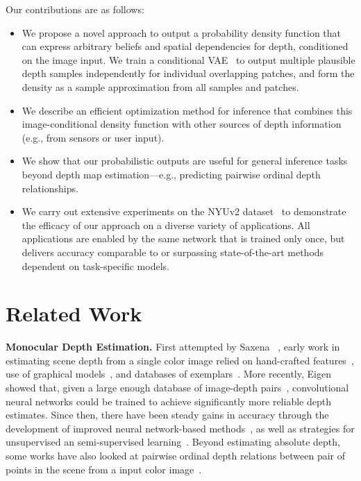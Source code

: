 \documentclass[10pt,twocolumn,letterpaper]{article}
\begin{document}
Our contributions are as follows:
\begin{itemize}[nosep,leftmargin=]
\item We propose a novel approach to output a probability density function that can express arbitrary beliefs and spatial dependencies for depth, conditioned on the image input. We train a conditional VAE~\cite{condVAE} to output multiple plausible depth samples independently for individual overlapping patches, and form the density as a sample approximation from all samples and patches.
\item We describe an efficient optimization method for inference that combines this image-conditional density function with other sources of depth information (e.g., from sensors or user input).
\item We show that our probabilistic outputs are useful for general inference tasks beyond depth map estimation---e.g., predicting pairwise ordinal depth relationships.
\item We carry out extensive experiments on the NYUv2 dataset~\cite{silberman2012indoor} to demonstrate the efficacy of our approach on a diverse variety of applications. All applications are enabled by the same network that is trained only once, but delivers accuracy comparable to or surpassing state-of-the-art methods dependent on task-specific models.
\end{itemize}

\section{Related Work}
\label{sec:rw}

\noindent\textbf{Monocular Depth Estimation.} First attempted by Saxena \etal~\cite{saxena2006learning}, early work in estimating scene depth from a single color image relied on hand-crafted features~\cite{saxena2009make3d,ladicky2014pulling,shi2015break,ranftl2016dense}, use of graphical models~\cite{saxena2009make3d,liu2014discrete,zhuo2015indoor}, and databases of exemplars~\cite{konrad2013learning,karsch2014depth}. More recently, 
Eigen \etal~\cite{eigen2014depth} showed that, given a large enough database of image-depth pairs~\cite{silberman2012indoor}, convolutional neural networks could be trained to achieve significantly more reliable depth estimates. Since then, there have been steady gains in accuracy through the development of improved neural network-based methods~\cite{eigen2015predicting,zhang2015monocular, wang2015designing,roy2016monocular,liu2016learning,chakrabarti2016depth,Li_2017_ICCV,heo2018monocular,lee2018single,fu2018deep}, as well as strategies for unsupervised an semi-supervised learning~\cite{garg2016unsupervised,kuznietsov2017semi,chen2016single}. Beyond estimating absolute depth, some works have also looked at pairwise ordinal depth relations between pair of points in the scene from a input color image~\cite{zoran2015learning,chen2016single}.
\end{document}
